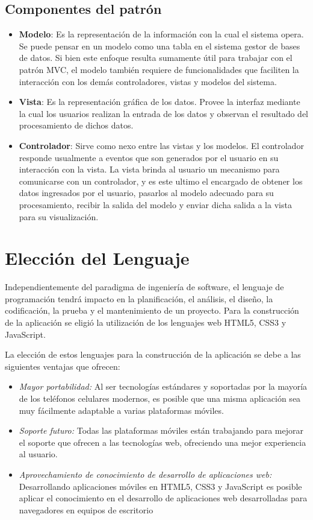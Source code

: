 \subsection{Componentes del patrón}
\begin{itemize}
    \item \textbf{Modelo}: Es la representación de la información con la cual el sistema opera. Se
    puede pensar en un modelo como una tabla en el sistema gestor de bases de datos.
    Si bien este enfoque resulta sumamente útil para trabajar con el patrón MVC,
    el modelo también requiere de funcionalidades que faciliten la interacción con los
    demás controladores, vistas y modelos del sistema.
    \item \textbf{Vista}: Es la representación gráfica de los datos. Provee la interfaz mediante la cual
    los usuarios realizan la entrada de los datos y observan el resultado del procesamiento
    de dichos datos.
    \item \textbf{Controlador}: Sirve como nexo entre las vistas y los modelos. El controlador responde
    usualmente a eventos que son generados por el usuario en su interacción con
    la vista. La vista brinda al usuario un mecanismo para comunicarse con un controlador,
    y es este ultimo el encargado de obtener los datos ingresados por el usuario,
    pasarlos al modelo adecuado para su procesamiento, recibir la salida del modelo y
    enviar dicha salida a la vista para su visualización.
    
\end{itemize}



\section{Elección del Lenguaje}

    Independientemente del paradigma de ingeniería de software, el lenguaje de programación tendrá impacto en la planificación, el análisis, el diseño, la codificación, la prueba y el mantenimiento de un proyecto. Para la construcción de la aplicación se eligió la utilización de los lenguajes web HTML5, CSS3 y JavaScript.

    La elección de estos lenguajes para la construcción de la aplicación se debe a las siguientes ventajas que ofrecen:
    \begin{itemize}
        \item \emph{Mayor portabilidad:} Al ser tecnologías estándares y soportadas por la mayoría de los teléfonos celulares modernos, es posible que una misma aplicación sea muy fácilmente adaptable a varias plataformas móviles.
        \item \emph{Soporte futuro:} Todas las plataformas móviles están trabajando para mejorar el soporte que ofrecen a las tecnologías web, ofreciendo una mejor experiencia al usuario.
        \item \emph{Aprovechamiento de conocimiento de desarrollo de aplicaciones web:} Desarrollando aplicaciones móviles en \gls{HTML}5, \gls{CSS}3 y \gls{JavaScript} es posible aplicar el conocimiento en el desarrollo de aplicaciones web desarrolladas para navegadores en equipos de escritorio 
    \end{itemize}


